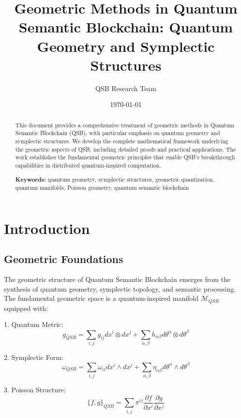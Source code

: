 \documentclass[12pt]{article}
\title{Geometric Methods in Quantum Semantic Blockchain: Quantum Geometry and Symplectic Structures}
\author{QSB Research Team}
\date{\today}
\begin{document}
\maketitle

\begin{abstract}
This document provides a comprehensive treatment of geometric methods in Quantum Semantic Blockchain (QSB), with particular emphasis on quantum geometry and symplectic structures. We develop the complete mathematical framework underlying the geometric aspects of QSB, including detailed proofs and practical applications. The work establishes the fundamental geometric principles that enable QSB's breakthrough capabilities in distributed quantum-inspired computation.

\textbf{Keywords:} quantum geometry, symplectic structures, geometric quantization, quantum manifolds, Poisson geometry, quantum semantic blockchain
\end{abstract}

\tableofcontents

\section{Introduction}

\subsection{Geometric Foundations}

The geometric structure of Quantum Semantic Blockchain emerges from the synthesis of quantum geometry, symplectic topology, and semantic processing. The fundamental geometric space is a quantum-inspired manifold $\mathcal{M}_{QSB}$ equipped with:

1. Quantum Metric:
\begin{equation}
g_{QSB} = \sum_{i,j} g_{ij} dx^i \otimes dx^j + \sum_{\alpha,\beta} h_{\alpha\beta} dθ^\alpha \otimes dθ^\beta
\end{equation}

2. Symplectic Form:
\begin{equation}
ω_{QSB} = \sum_{i,j} ω_{ij} dx^i \wedge dx^j + \sum_{\alpha,\beta} η_{\alpha\beta} dθ^\alpha \wedge dθ^\beta
\end{equation}

3. Poisson Structure:
\begin{equation}
\{f,g\}_{QSB} = \sum_{i,j} π^{ij} \frac{\partial f}{\partial x^i} \frac{\partial g}{\partial x^j}
\end{equation}
\end{document}
